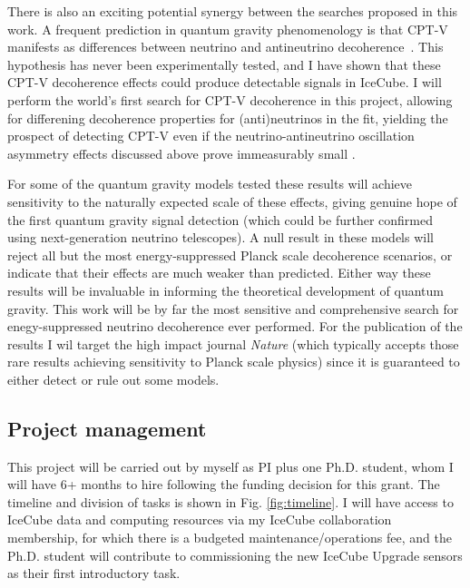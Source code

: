 \documentclass[a4paper,11pt]{article}
\begin{document}
There is also an exciting potential synergy between the searches proposed in this work. A frequent prediction in quantum gravity phenomenology is that CPT-V manifests as differences between neutrino and antineutrino decoherence~\cite{Mavromatos_2009, Barenboim:2004wu, Carrasco:2018sca, Buoninfante:2020iyr, Capolupo:2020myw}. This hypothesis has never been experimentally tested, and I have shown that these CPT-V decoherence effects could produce detectable signals in IceCube. I will perform the world's first search for CPT-V decoherence in this project, allowing for differening decoherence properties for (anti)neutrinos in the fit, yielding the prospect of detecting CPT-V even if the neutrino-antineutrino oscillation asymmetry effects discussed above prove immeasurably small .

For some of the quantum gravity models tested these results will achieve sensitivity to the naturally expected scale of these effects, giving genuine hope of the first quantum gravity signal detection (which could be further confirmed using next-generation neutrino telescopes). A null result in these models will reject all but the most energy-suppressed Planck scale decoherence scenarios, or indicate that their effects are much weaker than predicted. Either way these results will be invaluable in informing the theoretical development of quantum gravity. This work will be by far the most sensitive and comprehensive search for enegy-suppressed neutrino decoherence ever performed. For the publication of the results I wil target the high impact journal \textit{Nature} (which typically accepts those rare results achieving sensitivity to Planck scale physics) since it is guaranteed to either detect or rule out some models. 



\subsection{Project management}

This project will be carried out by myself as PI plus one Ph.D. student, whom I will have 6+ months to hire following the funding decision for this grant. The timeline and division of tasks is shown in Fig. \ref{fig:timeline}. I will have access to IceCube data and computing resources via my IceCube collaboration membership, for which there is a budgeted maintenance/operations fee, and the Ph.D. student will contribute to commissioning the new IceCube Upgrade sensors as their first introductory task. 
\end{document}
